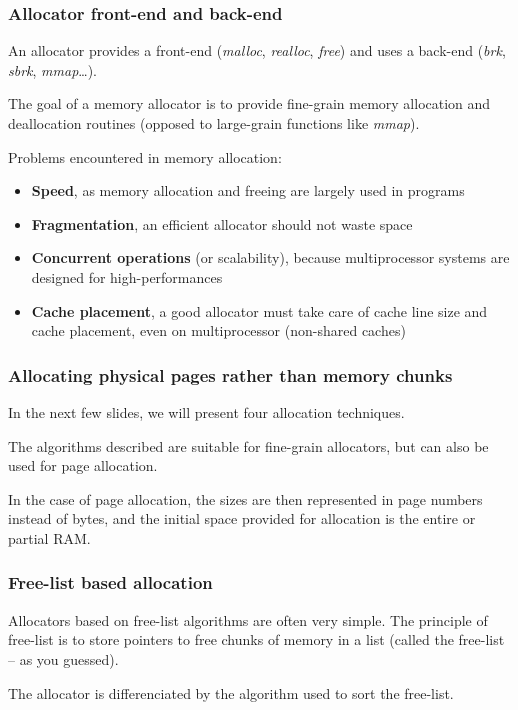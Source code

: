 
\begin{frame}
  \frametitle{Allocator front-end and back-end}

  An allocator provides a front-end (\emph{malloc}, \emph{realloc},
  \emph{free}) and uses a back-end (\emph{brk}, \emph{sbrk},
  \emph{mmap}\ldots).

  \-

  The goal of a memory allocator is to provide fine-grain memory
  allocation and deallocation routines (opposed to large-grain
  functions like \emph{mmap}).

  \-

  Problems encountered in memory allocation:

  \begin{itemize}
  \item
    \textbf{Speed}, as memory allocation and freeing are largely used
    in programs
  \item
    \textbf{Fragmentation}, an efficient allocator should not waste
    space
  \item
    \textbf{Concurrent operations} (or scalability), because
    multiprocessor systems are designed for high-performances
  \item
    \textbf{Cache placement}, a good allocator must take care of cache
    line size and cache placement, even on multiprocessor (non-shared
    caches)
  \end{itemize}

\end{frame}


\begin{frame}
  \frametitle{Allocating physical pages rather than memory chunks}

  In the next few slides, we will present four allocation techniques.

  \-

  The algorithms described are suitable for fine-grain allocators, but
  can also be used for page allocation.

  \-

  In the case of page allocation, the sizes are then represented in
  page numbers instead of bytes, and the initial space provided for
  allocation is the entire or partial RAM.

\end{frame}


\begin{frame}
  \frametitle{Free-list based allocation}

  Allocators based on free-list algorithms are often very simple. The
  principle of free-list is to store pointers to free chunks of memory
  in a list (called the free-list -- as you guessed).

  \begin{center}
  \end{center}

  \-

  The allocator is differenciated by the algorithm used to sort the
  free-list.

\end{frame}

